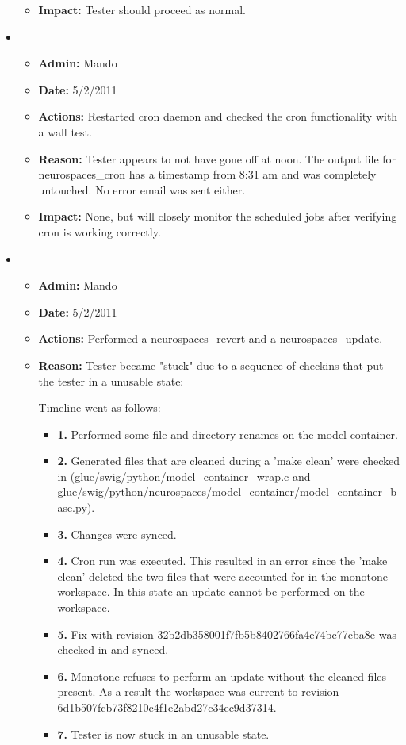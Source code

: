 \documentclass[12pt]{article}
\begin{document}
\begin{itemize}
\begin{itemize}
  \item[] {\bf Impact:} Tester should proceed as normal.  
  \end{itemize}
  

\item
  \begin{itemize}
  \item[] {\bf Admin:} Mando
  \item[] {\bf Date:} 5/2/2011
  \item[] {\bf Actions:} Restarted cron daemon and checked the cron
    functionality with a wall test.
  \item[] {\bf Reason:} Tester appears to not have gone off at noon.
    The output file for neurospaces\_cron has a timestamp from 8:31 am
    and was completely untouched. No error email was sent either.
  \item[] {\bf Impact:} None, but will closely monitor the scheduled
    jobs after verifying cron is working correctly.
  \end{itemize}
  
  
\item
  \begin{itemize}
  \item[] {\bf Admin:} Mando
  \item[] {\bf Date:} 5/2/2011
  \item[] {\bf Actions:} Performed a neurospaces\_revert and a neurospaces\_update.
  \item[] {\bf Reason:} Tester became "stuck" due to a sequence of checkins that put the tester in a unusable state:
  
  Timeline went as follows:
  
  \begin{itemize}
  \item[] {\bf 1.} Performed some file and directory renames on the
    model container.
  \item[] {\bf 2.} Generated files that are cleaned during a 'make
    clean' were checked in (glue/swig/python/model\_container\_wrap.c
    and
    glue/swig/python/neurospaces/model\_container/model\_container\_base.py).
  \item[] {\bf 3.}  Changes were synced.
  \item[] {\bf 4.}  Cron run was executed. This resulted in an error
    since the 'make clean' deleted the two files that were accounted
    for in the monotone workspace. In this state an update cannot be
    performed on the workspace.
  \item[] {\bf 5.}  Fix with revision
    32b2db358001f7fb5b8402766fa4e74bc77cba8e was checked in and
    synced.
  \item[] {\bf 6.}  Monotone refuses to perform an update without the
    cleaned files present. As a result the workspace was current to
    revision 6d1b507fcb73f8210c4f1e2abd27c34ec9d37314.
  \item[] {\bf 7.}  Tester is now stuck in an unusable state.
  \end{itemize}
  

\end{itemize}
\end{itemize}
\end{document}
